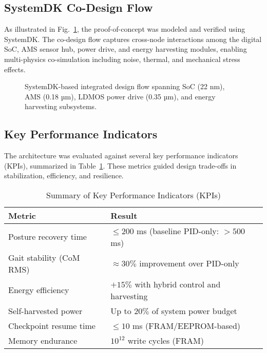 \subsection{SystemDK Co-Design Flow}
As illustrated in Fig.~\ref{fig:systemdk_flow}, the proof-of-concept was modeled and verified
using SystemDK. The co-design flow captures cross-node interactions among the digital SoC,
AMS sensor hub, power drive, and energy harvesting modules, enabling multi-physics
co-simulation including noise, thermal, and mechanical stress effects.

\begin{figure}[t]
  \centering
  \caption{SystemDK-based integrated design flow spanning SoC (22 nm), AMS (0.18 µm),
  LDMOS power drive (0.35 µm), and energy harvesting subsystems.}
  \label{fig:systemdk_flow}
\end{figure}

\subsection{Key Performance Indicators}
The architecture was evaluated against several key performance indicators (KPIs),
summarized in Table~\ref{tab:kpi_summary}. These metrics guided design trade-offs
in stabilization, efficiency, and resilience.

\begin{table}[t]
\caption{Summary of Key Performance Indicators (KPIs)}
\label{tab:kpi_summary}
\centering
\renewcommand{\arraystretch}{1.15}
\footnotesize
\begin{tabular}{@{}p{} p{}@{}}
\toprule
\textbf{Metric} & \textbf{Result} \\
\midrule
Posture recovery time & $\leq 200$ ms (baseline PID-only: $>500$ ms) \\
Gait stability (CoM RMS) & $\approx 30\%$ improvement over PID-only \\
Energy efficiency & $+15\%$ with hybrid control and harvesting \\
Self-harvested power & Up to $20\%$ of system power budget \\
Checkpoint resume time & $\leq 10$ ms (FRAM/EEPROM-based) \\
Memory endurance & $10^{12}$ write cycles (FRAM) \\
\bottomrule
\end{tabular}
\end{table}
